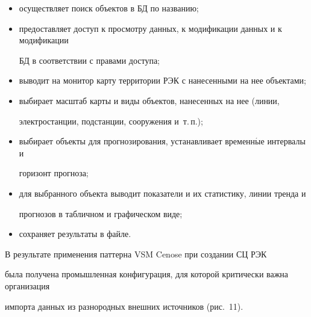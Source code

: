   \begin{itemize}


\item осуществляет поиск объектов в БД по названию; 


\item предоставляет доступ к просмотру данных, к модификации данных и к модификации 


БД в соответствии с правами доступа; 


\item выводит на монитор карту территории РЭК с нанесенными на нее объектами; 


\item выбирает масштаб карты и виды объектов, нанесенных на нее (линии, 


электростанции, подстанции, сооружения и~т.\,п.); 


\item выбирает объекты для прогнозирования, устанавливает временн$\acute{\mbox{ы}}$е интервалы и 


горизонт прогноза; 


\item для выбранного объекта выводит показатели и их статистику, линии тренда и 


прогнозов в табличном и графическом виде; 


\item сохраняет результаты в файле.


\end{itemize}





  В результате применения паттерна VSM Cenose при создании СЦ РЭК 


была получена промышленная конфигурация, для которой критически важна организация 


импорта данных из разнородных внешних источников (рис.~11).





